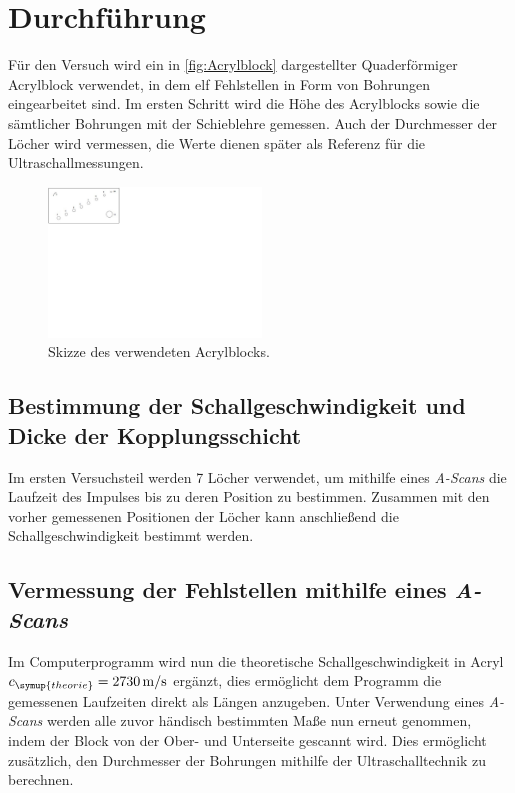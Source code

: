 \section{Durchführung}
\label{sec:Durchführung}

Für den Versuch wird ein in \autoref{fig:Acrylblock} dargestellter Quaderförmiger Acrylblock verwendet,
in dem elf Fehlstellen in Form von Bohrungen eingearbeitet sind.
Im ersten Schritt wird die Höhe des Acrylblocks sowie die sämtlicher Bohrungen mit der Schieblehre gemessen.
Auch der Durchmesser der Löcher wird vermessen, die Werte dienen später als Referenz für die Ultraschallmessungen.
\begin{figure}
    \centering
    \includegraphics[height=4cm]{content/pics/acrylblock.pdf}
    \caption{Skizze des verwendeten Acrylblocks.\cite{US2}}
    \label{fig:Acrylblock}
\end{figure}

\subsection{Bestimmung der Schallgeschwindigkeit und Dicke der Kopplungsschicht}
Im ersten Versuchsteil werden 7 Löcher verwendet, um mithilfe eines \textit{A-Scans} die Laufzeit des Impulses
bis zu deren Position zu bestimmen. Zusammen mit den vorher gemessenen Positionen der Löcher kann anschließend
die Schallgeschwindigkeit bestimmt werden.

\subsection{Vermessung der Fehlstellen mithilfe eines \textit{A-Scans}}
\label{sec:arschscan}
Im Computerprogramm wird nun die theoretische Schallgeschwindigkeit in Acryl
$c_{\symup{theorie}}=\qty{2730}{\metre\per\second}$ \cite{c_Acryl} ergänzt, dies ermöglicht dem Programm
die gemessenen Laufzeiten direkt als Längen anzugeben.
Unter Verwendung eines \textit{A-Scans} werden alle zuvor händisch bestimmten Maße nun erneut genommen,
indem der Block von der Ober- und Unterseite gescannt wird.
Dies ermöglicht zusätzlich, den Durchmesser der Bohrungen mithilfe der Ultraschalltechnik zu berechnen.

